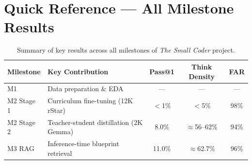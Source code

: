 \documentclass[12pt,a4paper]{article}
\begin{document}
\appendix

\section{Quick Reference --- All Milestone Results}

\begin{table}[H]
\centering
\caption{Summary of key results across all milestones of \textit{The Small Coder} project.}
\label{tab:appendix}
\renewcommand{\arraystretch}{1.3}
\begin{tabularx}{\textwidth}{p{2cm}Xccc}
\toprule
\textbf{Milestone} & \textbf{Key Contribution} & \textbf{Pass@1} & \textbf{Think Density} & \textbf{FAR} \\
\midrule
M1         & Data preparation \& EDA               & ---      & ---             & ---   \\
M2 Stage 1 & Curriculum fine-tuning (12K rStar)    & $<$1\%   & $<$5\%          & 98\%  \\
M2 Stage 2 & Teacher-student distillation (2K Gemma) & 8.0\%  & $\approx$56--62\% & 94\% \\
M3 RAG     & Inference-time blueprint retrieval    & 11.0\%   & $\approx$62.7\% & 96\%  \\
\bottomrule
\end{tabularx}
\end{table}
\end{document}
